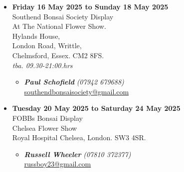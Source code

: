 \begin{itemize}
    \item \textbf{Friday 16 May 2025 to Sunday 18 May 2025}
    \\
    Southend Bonsai Society Display \\
    At The National Flower Show. \\
    Hylands House, \\
    London Road, Writtle, \\
    Chelmsford, Essex. CM2 8FS.
    \\
    \emph{tba. 09.30-21:00.hrs}
    \begin{itemize}
        \item \textbf{\emph{Paul Schofield}} \emph{(07942 679688)} \\
        \href{mailto:southendbonsaisociety@gmail.com}{southendbonsaisociety@gmail.com}
    \end{itemize}

    \item \textbf{Tuesday 20 May 2025 to Saturday 24 May 2025}
    \\
    FOBBs Bonsai Display \\
    Chelsea Flower Show \\
    Royal Hospital Chelsea, London. SW3 4SR.
    \begin{itemize}
        \item \textbf{\emph{Russell Wheeler}} \emph{(07810 372377)} \\
        \href{mailto:russboy23@gmail.com}{russboy23@gmail.com}
    \end{itemize}

\end{itemize}
\closearticle
\pagebreak
